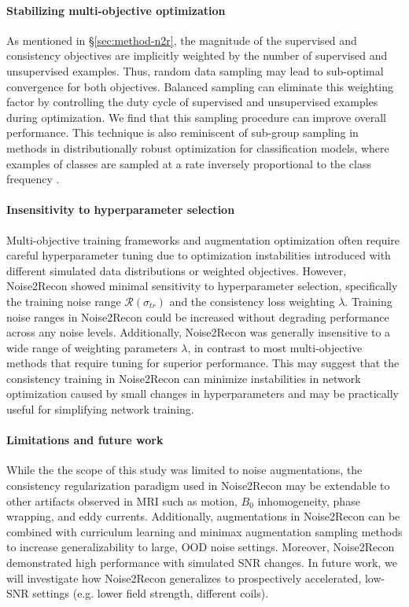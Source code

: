 \documentclass[10pt,twocolumn,letterpaper]{article}
\newcommand{\noiserange}{\mathcal{R}(\sigma_{tr})}
\newcommand{\RV}[1]{{#1}}
\begin{document}
\paragraph{Stabilizing multi-objective optimization} As mentioned in \S\ref{sec:method-n2r}, the magnitude of the supervised and consistency objectives are implicitly weighted by the number of supervised and unsupervised examples. Thus, random data sampling may lead to sub-optimal convergence for both objectives. Balanced sampling can eliminate this weighting factor by controlling the duty cycle of supervised and unsupervised examples during optimization. We find that this sampling procedure can improve overall performance. This technique is also reminiscent of sub-group sampling in methods in distributionally robust optimization for classification models, where examples of classes are sampled at a rate inversely proportional to the class frequency \cite{sagawa2019distributionally}.

\paragraph{Insensitivity to hyperparameter selection} Multi-objective training frameworks and augmentation optimization often require careful hyperparameter tuning due to optimization instabilities introduced with different simulated data distributions or weighted objectives. However, Noise2Recon showed minimal sensitivity to hyperparameter selection, specifically the training noise range $\noiserange$ and the consistency loss weighting $\lambda$. Training noise ranges in Noise2Recon could be increased without degrading performance across any noise levels. Additionally, Noise2Recon was generally insensitive to a wide range of weighting parameters $\lambda$, in contrast to most multi-objective methods that require tuning for superior performance. This may suggest that the consistency training in Noise2Recon can minimize instabilities in network optimization caused by small changes in hyperparameters and may be practically useful for simplifying network training.

\paragraph{Limitations and future work}
While the the scope of this study was limited to noise augmentations, the consistency regularization paradigm used in Noise2Recon may be extendable to other artifacts observed in MRI such as motion, $B_0$ inhomogeneity, phase wrapping, and eddy currents. \RV{Additionally, augmentations in Noise2Recon can be combined with curriculum learning \cite{braun2017curriculum} and minimax augmentation sampling methods \cite{gnanasambandam2020one} to increase generalizability to large, OOD noise settings. Moreover, Noise2Recon demonstrated high performance with simulated SNR changes. In future work, we will investigate how Noise2Recon generalizes to prospectively accelerated, low-SNR settings (e.g. lower field strength, different coils).}
\end{document}
